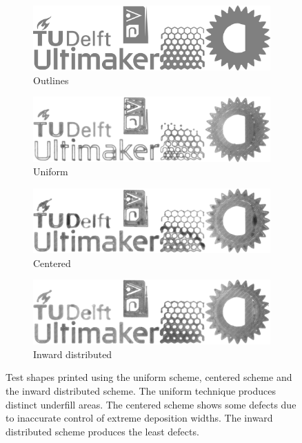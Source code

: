 {\begin{figure}
\centering
\setlength{\figwidth}{\columnwidth}
\begin{subfigure}{\figwidth}\centering
\includegraphics[width=\figwidth]{sources-applications-result-prints-target}
\caption{Outlines}\label{print_outlines}
\end{subfigure}
\begin{subfigure}{\figwidth}\centering
\includegraphics[width=\figwidth]{sources-applications-result-prints-naive-bw.png}
\caption{Uniform}\label{print_naive}
\end{subfigure}
\begin{subfigure}{\figwidth}\centering
\includegraphics[width=\figwidth]{sources-applications-result-prints-center-bw.png}
\caption{Centered}\label{print_center}
\end{subfigure}
\begin{subfigure}{\figwidth}\centering
\includegraphics[width=\figwidth]{sources-applications-result-prints-inward-bw.png}
\caption{Inward distributed}\label{print_inward}
\end{subfigure}
\caption{
Test shapes printed using the uniform scheme, centered scheme and the inward distributed scheme.
The uniform technique produces distinct underfill areas.
The centered scheme shows some defects due to inaccurate control of extreme deposition widths.
The inward distributed scheme produces the least defects.
}
\label{prints}
\end{figure}


}
